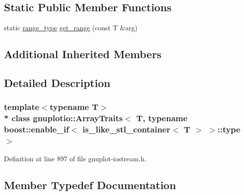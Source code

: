 \subsection*{Static Public Member Functions}
\begin{DoxyCompactItemize}
\item 
static \hyperlink{classgnuplotio_1_1_array_traits_3_01_t_00_01typename_01boost_1_1enable__if_3_01is__like__stl__co9e1736bbd08cd58c6993ab613a998887_ab702072abbe018bbc90b9967ca8c4b42}{range\+\_\+type} \hyperlink{classgnuplotio_1_1_array_traits_3_01_t_00_01typename_01boost_1_1enable__if_3_01is__like__stl__co9e1736bbd08cd58c6993ab613a998887_a89d4150ab3c479cde972071a10acd27b}{get\+\_\+range} (const T \&arg)
\end{DoxyCompactItemize}
\subsection*{Additional Inherited Members}


\subsection{Detailed Description}
\subsubsection*{template$<$typename T$>$\\*
class gnuplotio\+::\+Array\+Traits$<$ T, typename boost\+::enable\+\_\+if$<$ is\+\_\+like\+\_\+stl\+\_\+container$<$ T $>$ $>$\+::type $>$}



Definition at line 897 of file gnuplot-\/iostream.\+h.



\subsection{Member Typedef Documentation}
